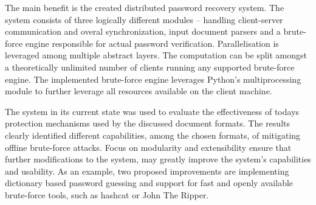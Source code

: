 \documentclass[11pt,oneside]{fithesis2}
\begin{document}
The main benefit is the created distributed password recovery system. The system consists of three logically different modules -- handling client-server communication and overal synchronization, input document parsers and a brute-force engine responsible for actual password verification. Parallelisation is leveraged among multiple abstract layers. The computation can be split amongst a theoretically unlimited number of clients running any supported brute-force engine. The implemented brute-force engine leverages Python's multiprocessing module to further leverage all resources available on the client machine. 

The system in its current state was used to evaluate the effectiveness of todays protection mechanisms used by the discussed document formats. The results clearly identified different capabilities, among the chosen formats, of mitigating offline brute-force attacks. Focus on modularity and extensibility ensure that further modifications to the system, may greatly improve the system's capabilities and usability. As an example, two proposed improvements are implementing dictionary based password guessing and support for fast and openly available brute-force tools, such as hashcat or John The Ripper.

 

\end{document}
